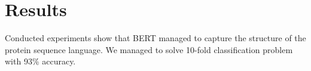 \documentclass[12pt, twoside]{article}
\begin{document}
\section{Results}
\noindent

Conducted experiments show that BERT managed to capture the structure of the protein sequence language. We managed to solve 10-fold classification problem with 93\% accuracy.











	   	
	
  	     	
\end{document}
